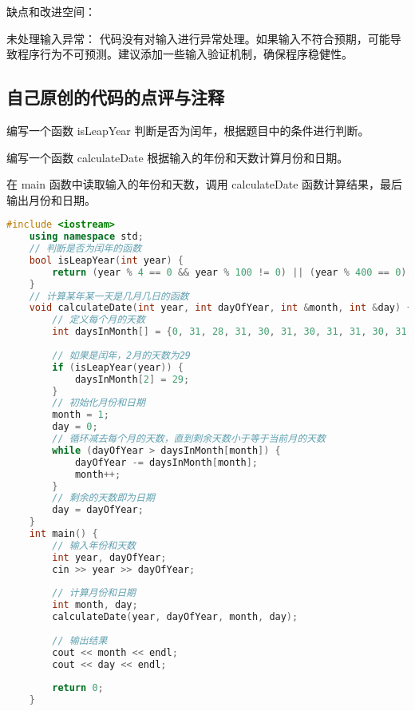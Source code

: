 缺点和改进空间：

未处理输入异常： 代码没有对输入进行异常处理。如果输入不符合预期，可能导致程序行为不可预测。建议添加一些输入验证机制，确保程序稳健性。

\subsection{自己原创的代码的点评与注释}

编写一个函数 isLeapYear 判断是否为闰年，根据题目中的条件进行判断。

编写一个函数 calculateDate 根据输入的年份和天数计算月份和日期。

在 main 函数中读取输入的年份和天数，调用 calculateDate 函数计算结果，最后输出月份和日期。

\begin{lstlisting}[language=C++]
    #include <iostream>
    using namespace std;
    // 判断是否为闰年的函数
    bool isLeapYear(int year) {
        return (year % 4 == 0 && year % 100 != 0) || (year % 400 == 0);
    }
    // 计算某年某一天是几月几日的函数
    void calculateDate(int year, int dayOfYear, int &month, int &day) {
        // 定义每个月的天数
        int daysInMonth[] = {0, 31, 28, 31, 30, 31, 30, 31, 31, 30, 31, 30, 31};
    
        // 如果是闰年，2月的天数为29
        if (isLeapYear(year)) {
            daysInMonth[2] = 29;
        }
        // 初始化月份和日期
        month = 1;
        day = 0;
        // 循环减去每个月的天数，直到剩余天数小于等于当前月的天数
        while (dayOfYear > daysInMonth[month]) {
            dayOfYear -= daysInMonth[month];
            month++;
        }
        // 剩余的天数即为日期
        day = dayOfYear;
    }
    int main() {
        // 输入年份和天数
        int year, dayOfYear;
        cin >> year >> dayOfYear;
    
        // 计算月份和日期
        int month, day;
        calculateDate(year, dayOfYear, month, day);
    
        // 输出结果
        cout << month << endl;
        cout << day << endl;
    
        return 0;
    }    
\end{lstlisting}